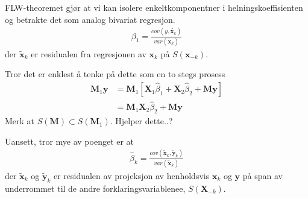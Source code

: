 FLW-theoremet gjør at vi kan isolere enkeltkomponentner i helningskoeffisienten og betrakte det som analog bivariat regresjon.
\begin{align}
\beta_1 = \frac{cov(y,\tilde{\mathbf{x}_k})}{var(\tilde{\mathbf{x}}_k)}
\end{align}
der $\tilde{\mathbf{x}}_k$ er residualen fra regresjonen av $\mathbf{x}_k$ på $S(\mathbf{x}_{-k})$.

Tror det er enklest å tenke på dette som en to stegs prosess
\begin{align}
\mathbf{M}_1\mathbf{y}&=\mathbf{M}_1[\mathbf{X}_1\hat{\beta}_1 + \mathbf{X}_2\hat{\beta}_2 + \mathbf{M}\mathbf{y}] \\
&= \mathbf{M}_1 \mathbf{X}_2\hat{\beta}_2 + \mathbf{M}\mathbf{y}
\end{align}
Merk at $S(\mathbf{M}) \subset S(\mathbf{M}_1)$. Hjelper dette..?

Uansett, tror mye av poenget er at
\begin{align}
\hat{\beta}_k = \frac{cov(\tilde{\mathbf{x}}_k,\tilde{\mathbf{y}}_k)}{var(\tilde{\mathbf{x}}_k)}
\end{align}
der $\tilde{\mathbf{x}}_k$ og $\tilde{\mathbf{y}}_k$ er residualen av projeksjon av henholdsvis $\mathbf{x}_k$ og $\mathbf{y}$ på span av underrommet til de andre forklaringsvariablenee, $S(\mathbf{X}_{-k})$.
